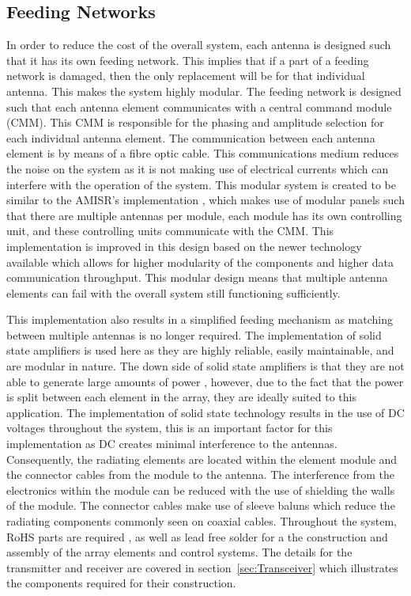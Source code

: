 \documentclass[11pt]{witseiepaper}
\begin{document}
\begin{bibunit}[witseie]
\subsection{Feeding Networks} \label{sec:FeedingNetworks}
In order to reduce the cost of the overall system, each antenna is designed such that it has its own feeding network. This implies that if a part of a feeding network is damaged, then the only replacement will be for that individual antenna. This makes the system highly modular. 
The feeding network is designed such that each antenna element communicates with a central command module (CMM). This CMM is responsible for the phasing and amplitude selection for each individual antenna element.
The communication between each antenna element is by means of a fibre optic cable. This communications medium reduces the noise on the system as it is not making use of electrical currents which can interfere with the operation of the system.
This modular system is created to be similar to the AMISR's implementation \cite{AMISR}, which makes use of modular panels such that there are multiple antennas per module, each module has its own controlling unit, and these controlling units communicate with the CMM.
This implementation is improved in this design based on the newer technology available which allows for higher modularity of the components and higher data communication throughput.
This modular design means that multiple antenna elements can fail with the overall system still functioning sufficiently.





This implementation also results in a simplified feeding mechanism as matching between multiple antennas is no longer required.
The implementation of solid state amplifiers is used here as they are highly reliable, easily maintainable, and are modular in nature. The down side of solid state amplifiers is that they are not able to generate large amounts of power \cite[p.~364]{radarHandbook}, however, due to the fact that the power is split between each element in the array, they are ideally suited to this application. The implementation of solid state technology results in the use of DC voltages throughout the system, this is an important factor for this implementation as DC creates minimal interference to the antennas.
Consequently, the radiating elements are located within the element module and the connector cables from the module to the antenna.
The interference from the electronics within the module can be reduced with the use of shielding the walls of the module. The connector cables make use of sleeve baluns which reduce the radiating components commonly seen on coaxial cables.
Throughout the system, RoHS parts are required \cite{RoHS}, as well as lead free solder for a the construction and assembly of the array elements and control systems. 
The details for the transmitter and receiver are covered in section~\ref{sec:Transceiver} which illustrates the components required for their construction.


\end{bibunit}
\end{document}
